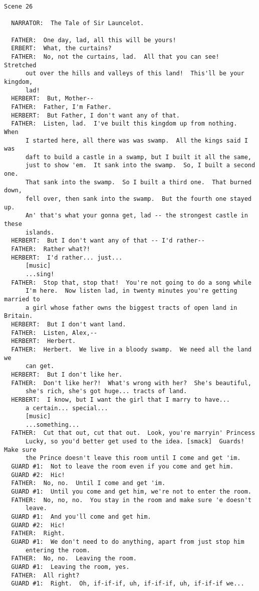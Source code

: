 \documentclass{article}
\begin{document}
\begin{verbatim}
Scene 26

  NARRATOR:  The Tale of Sir Launcelot.

  FATHER:  One day, lad, all this will be yours!
  ERBERT:  What, the curtains?
  FATHER:  No, not the curtains, lad.  All that you can see!  Stretched
      out over the hills and valleys of this land!  This'll be your kingdom,
      lad!
  HERBERT:  But, Mother--
  FATHER:  Father, I'm Father.
  HERBERT:  But Father, I don't want any of that.
  FATHER:  Listen, lad.  I've built this kingdom up from nothing.  When
      I started here, all there was was swamp.  All the kings said I was
      daft to build a castle in a swamp, but I built it all the same,
      just to show 'em.  It sank into the swamp.  So, I built a second one.
      That sank into the swamp.  So I built a third one.  That burned down,
      fell over, then sank into the swamp.  But the fourth one stayed up.
      An' that's what your gonna get, lad -- the strongest castle in these
      islands.
  HERBERT:  But I don't want any of that -- I'd rather--
  FATHER:  Rather what?!
  HERBERT:  I'd rather... just...
      [music]
      ...sing!
  FATHER:  Stop that, stop that!  You're not going to do a song while
      I'm here.  Now listen lad, in twenty minutes you're getting married to
      a girl whose father owns the biggest tracts of open land in Britain.
  HERBERT:  But I don't want land.
  FATHER:  Listen, Alex,--
  HERBERT:  Herbert.
  FATHER:  Herbert.  We live in a bloody swamp.  We need all the land we
      can get.
  HERBERT:  But I don't like her.
  FATHER:  Don't like her?!  What's wrong with her?  She's beautiful,
      she's rich, she's got huge... tracts of land.
  HERBERT:  I know, but I want the girl that I marry to have...
      a certain... special...
      [music]
      ...something...
  FATHER:  Cut that out, cut that out.  Look, you're marryin' Princess
      Lucky, so you'd better get used to the idea. [smack]  Guards!  Make sure
      the Prince doesn't leave this room until I come and get 'im.
  GUARD #1:  Not to leave the room even if you come and get him.
  GUARD #2:  Hic!
  FATHER:  No, no.  Until I come and get 'im.
  GUARD #1:  Until you come and get him, we're not to enter the room.
  FATHER:  No, no, no.  You stay in the room and make sure 'e doesn't
      leave.
  GUARD #1:  And you'll come and get him.
  GUARD #2:  Hic!
  FATHER:  Right.
  GUARD #1:  We don't need to do anything, apart from just stop him
      entering the room.
  FATHER:  No, no.  Leaving the room.
  GUARD #1:  Leaving the room, yes.
  FATHER:  All right?
  GUARD #1:  Right.  Oh, if-if-if, uh, if-if-if, uh, if-if-if we...

\end{verbatim}
\end{document}
